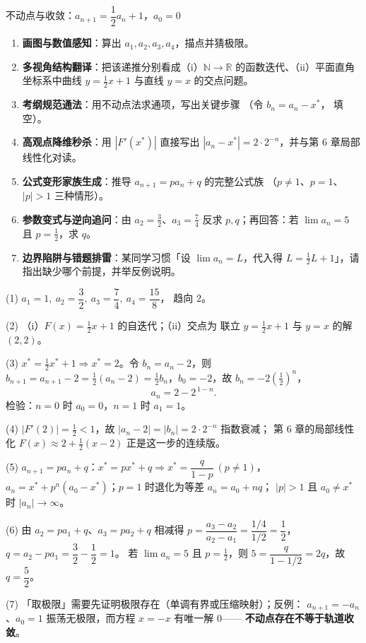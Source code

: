 \begin{masterq}{不动点与收敛：$a_{n+1}=\dfrac12a_n+1$，$a_0=0$}
\begin{enumerate}[label=(\arabic*), itemsep=3pt]
\item \textbf{画图与数值感知}：算出 $a_1,a_2,a_3,a_4$，描点并猜极限。
\item \textbf{多视角结构翻译}：把该递推分别看成（i）$\mathbb{N}\to\mathbb{R}$
的函数迭代、（ii）平面直角坐标系中曲线 $y=\tfrac12x+1$ 与直线 $y=x$
的交点问题。
\item \textbf{考纲规范通法}：用不动点法求通项，写出关键步骤
（令 $b_n=a_n-x^*$，\tk{} 填空）。
\item \textbf{高观点降维秒杀}：用 $|F'(x^*)|$ 直接写出
$|a_n-x^*|=2\cdot2^{-n}$，并与第 6 章局部线性化对读。
\item \textbf{公式变形家族生成}：推导 $a_{n+1}=pa_n+q$ 的完整公式族
（$p\neq1$、$p=1$、$|p|>1$ 三种情形）。
\item \textbf{参数变式与逆向追问}：由 $a_2=\tfrac32$、$a_3=\tfrac74$
反求 $p,q$；再回答：若 $\lim a_n=5$ 且 $p=\tfrac12$，求 $q$。
\item \textbf{边界陷阱与错题排雷}：某同学习惯「设 $\lim a_n=L$，代入得
$L=\tfrac12L+1$」，请指出缺少哪个前提，并举反例说明。
\end{enumerate}
\end{masterq}

\begin{solution}
(1) $a_1=1,\ a_2=\dfrac32,\ a_3=\dfrac74,\ a_4=\dfrac{15}8$，
趋向 $2$。

(2) （i）$F(x)=\tfrac12x+1$ 的自迭代；（ii）交点为
联立 $y=\tfrac12x+1$ 与 $y=x$ 的解 $(2,2)$。

(3) $x^*=\tfrac12x^*+1\Rightarrow x^*=2$。令 $b_n=a_n-2$，则
$b_{n+1}=a_{n+1}-2=\tfrac12(a_n-2)=\tfrac12 b_n$，$b_0=-2$，故
$b_n=-2\left(\tfrac12\right)^n$，
\[
  a_n=2-2^{\,1-n}.
\]
检验：$n=0$ 时 $a_0=0$，$n=1$ 时 $a_1=1$。

(4) $|F'(2)|=\tfrac12<1$，故 $|a_n-2|=|b_n|=2\cdot2^{-n}$ 指数衰减；
第 6 章的局部线性化 $F(x)\approx 2+\tfrac12(x-2)$ 正是这一步的连续版。

(5) $a_{n+1}=pa_n+q$：$x^*=px^*+q\Rightarrow x^*=\dfrac{q}{1-p}\ (p\neq1)$，
$a_n=x^*+p^n(a_0-x^*)$；$p=1$ 时退化为等差 $a_n=a_0+nq$；
$|p|>1$ 且 $a_0\neq x^*$ 时 $|a_n|\to\infty$。

(6) 由 $a_2=pa_1+q$、$a_3=pa_2+q$ 相减得
$p=\dfrac{a_3-a_2}{a_2-a_1}=\dfrac{1/4}{1/2}=\dfrac12$，
$q=a_2-pa_1=\dfrac32-\dfrac12=1$。
若 $\lim a_n=5$ 且 $p=\tfrac12$，则 $5=\dfrac q{1-1/2}=2q$，故 $q=\dfrac52$。

(7) 「取极限」需要先证明极限存在（单调有界或压缩映射）；反例：
$a_{n+1}=-a_n$、$a_0=1$ 振荡无极限，而方程 $x=-x$ 有唯一解 $0$——
\textbf{不动点存在不等于轨道收敛}。
\end{solution}

